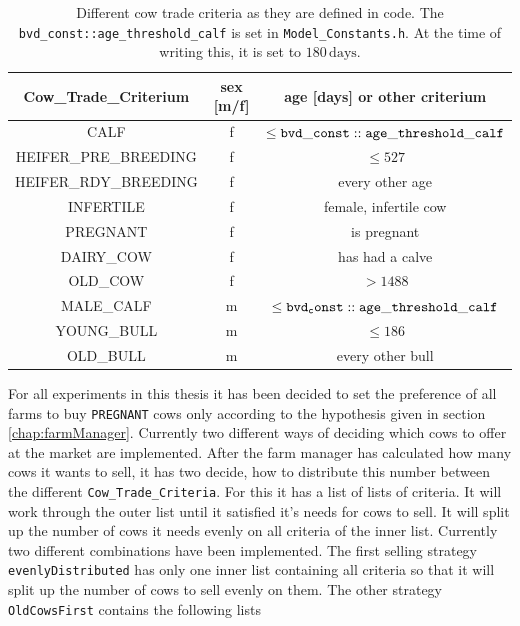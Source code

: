 \begin{table}[htb]
    \begin{center}
    \begin{tabular}{|ccc|}\hline
        \rowcolor{dunkelgrau} Cow\_Trade\_Criterium  & sex [m/f] & age [days] or other criterium \\\hline
                              CALF  & f& $\leq {\tt bvd\_const::age\_threshold\_calf}$\\\hline
\rowcolor{hellgrau}           HEIFER\_PRE\_BREEDING  & f& $\leq 527$\footnotemark \\\hline
                              HEIFER\_RDY\_BREEDING  & f& every other age \\\hline
\rowcolor{hellgrau}           INFERTILE  & f& female, infertile cow\footnotemark \\\hline
                              PREGNANT  & f& is pregnant\\\hline
\rowcolor{hellgrau}           DAIRY\_COW  & f& has had a calve\\\hline 
                              OLD\_COW & f& $> 1488 $\\ \hline
\rowcolor{hellgrau}            MALE\_CALF &   m & $\leq {\tt bvd_const::age\_threshold\_calf}$   \\\hline
                               YOUNG\_BULL & m  &  $\leq 186$  \\\hline 
\rowcolor{hellgrau}           OLD\_BULL   &  m  & every other bull   \\\hline           
\end{tabular}
\caption[Explanation of Cow Trade Criteria]{Different cow trade criteria as they are defined in code. The {\tt bvd\_const::age\_threshold\_calf} is set in {\tt Model\_Constants.h}. At the time of writing this, it is set to $ 180 \, \text{days} $.}
\label{tab:cowTradeCrit} 
\end{center}
\end{table}
For all experiments in this thesis it has been decided to set the preference of all farms to buy {\tt PREGNANT} cows only according to the hypothesis given in section \ref{chap:farmManager}. 
Currently two different ways of deciding which cows to offer at the market are implemented. After the farm manager has calculated how many cows it wants to sell, it has two decide, how to distribute this number between the different {\tt Cow\_Trade\_Criteria}. For this it has a list of lists of criteria. It will work through the outer list until it satisfied it's needs for cows to sell. It will split up the number of cows it needs evenly on all criteria of the inner list. Currently two different combinations have been implemented. The first selling strategy {\tt evenlyDistributed} has only one inner list containing all criteria so that it will split up the number of cows to sell evenly on them. The other strategy {\tt OldCowsFirst} contains the following lists
